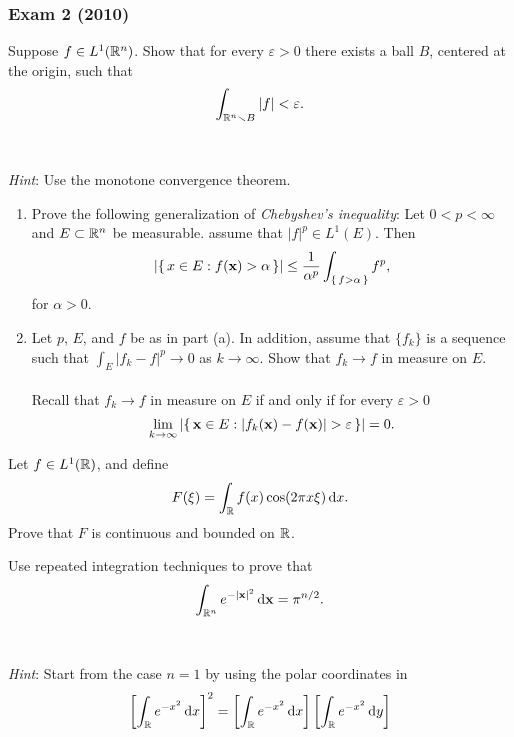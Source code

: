 \subsubsection{Exam 2 (2010)}
\setcounter{exercise}{0}

\begin{problem}
Suppose $f\in L^1(\mathbb{R}^n)$. Show that for every $\varepsilon>0$ there
exists a ball $B$, centered at the origin, such that
\[
\int_{\mathbb{R}^n\smallsetminus B}|f|<\varepsilon.
\]
\\\\
\emph{Hint}: Use the monotone convergence theorem.
\end{problem}
\begin{solution}
\end{solution}
\begin{problem}
\begin{enumerate}[label=(\alph*),noitemsep]
\item Prove the following generalization of \emph{Chebyshev's inequality}:
  Let $0<p<\infty$ and $E\subset\mathbb{R}^n$ be measurable. assume that
  $|f|^p\in L^1(E)$. Then
\[
\left|\left\{\,x\in E:f(\mathbf{x})>\alpha\,\right\}\right|
\leq\frac{1}{\alpha^p}\int_{\left\{\,f>\alpha\,\right\}}f^p,
\]
for $\alpha>0$.
\item Let $p$, $E$, and $f$ be as in part (a). In addition, assume that
  $\{f_k\}$ is a sequence such that $\int_E|f_k-f|^p\to 0$ as
  $k\to\infty$. Show that $f_k\to f$ in measure on $E$.
\\\\
Recall that $f_k\to f$ in measure on $E$ if and only if for every
$\varepsilon>0$
\[
\lim_{k\to\infty}\left|\left\{\,\bfx\in
    E:|f_k(\bfx)-f(\bfx)|>\varepsilon\,\right\}\right|=0.
\]
\end{enumerate}
\end{problem}
\begin{solution}
\end{solution}

\begin{problem}
Let $f\in L^1(\mathbb{R})$, and define
\[
F(\xi)=\int_{\mathbb{R}} f(x)\cos(2\pi x\xi)\mathop{}\!\mathrm{d} x.
\]
Prove that $F$ is continuous and bounded on $\mathbb{R}$.
\end{problem}
\begin{solution}
\end{solution}

\begin{problem}
Use repeated integration techniques to prove that
\[
\int_{\mathbb{R}^n} e^{-|\mathbf{x}|^2}\mathop{}\!\mathrm{d}\mathbf{x}=\pi^{n/2}.
\]
\\\\
\emph{Hint}: Start from the case $n=1$ by using the polar coordinates in
\[
\left[\int_{\mathbb{R}} e^{-x^2}\mathop{}\!\mathrm{d} x\right]^2=
\left[\int_{\mathbb{R}} e^{-x^2}\mathop{}\!\mathrm{d} x\right]
\left[\int_{\mathbb{R}} e^{-x^2}\mathop{}\!\mathrm{d} y\right]
\]
\end{problem}
\begin{solution}
\end{solution}

\begin{problem}
\end{problem}
\begin{solution}
\end{solution}

